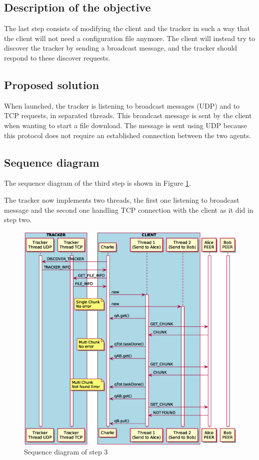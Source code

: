 \subsection{Description of the objective}

The last step consists of modifying the client and the tracker in such a way that the client will not need a configuration file anymore. The client will instead try to discover the tracker by sending a broadcast message, and the tracker should respond to these discover requests.

\subsection{Proposed solution}

When launched, the tracker is listening to broadcast messages (UDP) and to TCP requests, in separated threads. This broadcast message is sent by the client when wanting to start a file download. The message is sent using UDP because this protocol does not require an established connection between the two agents.

\subsection{Sequence diagram}

The sequence diagram of the third step is shown in Figure \ref{fig:step3}.

The tracker now implements two threads, the first one listening to broadcast message and the second one handling TCP connection with the client as it did in step two.

\begin{figure}
	\centering
	\includegraphics[width=\textwidth]{img/step3.eps}
	\caption{Sequence diagram of step 3}
	\label{fig:step3}
\end{figure}